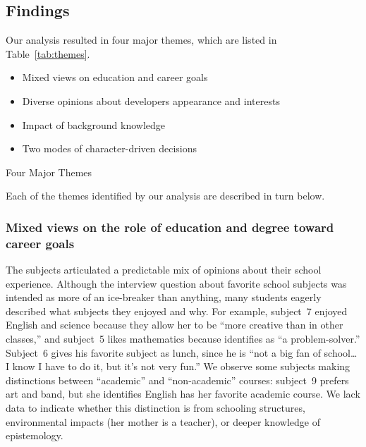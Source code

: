 \documentclass[letterpaper]{article}
\begin{document}
\subsection{Findings}

Our analysis resulted in four major themes, which are listed
in Table~\ref{tab:themes}.
%
\begin{table}
\begin{framed}
\begin{itemize}
\item Mixed views on education and career goals
\item Diverse opinions about developers appearance and interests
\item Impact of background knowledge
\item Two modes of character-driven decisions
\end{itemize}
\caption{Four Major Themes}
\label{tab:themes}
\end{framed}
\end{table}
%
Each of the themes identified by our analysis are described in turn below.


\newcommand{\theme}[1]{\subsubsection*{#1}}

\theme{Mixed views on the role of education and degree toward career goals}

The subjects articulated a predictable mix of opinions about their
school experience. Although the interview question about favorite
school subjects was intended as more of an ice-breaker than anything,
many students eagerly described what subjects they enjoyed and why.
For example, subject~7 enjoyed English and science because they allow her
to be ``more creative than in other classes,'' and subject~5 likes
mathematics because identifies as ``a problem-solver.''
Subject~6 gives his favorite subject as lunch, since he is ``not a big
fan of school\ldots{} I know I have to do it, but it's not very fun.''
We observe some subjects making distinctions between ``academic'' and 
``non-academic'' courses: subject~9 prefers art and band, but she identifies
English has her favorite academic course. We lack data to indicate whether
this distinction is from schooling structures, environmental impacts (her
mother is a teacher), or deeper knowledge of epistemology.
\end{document}
